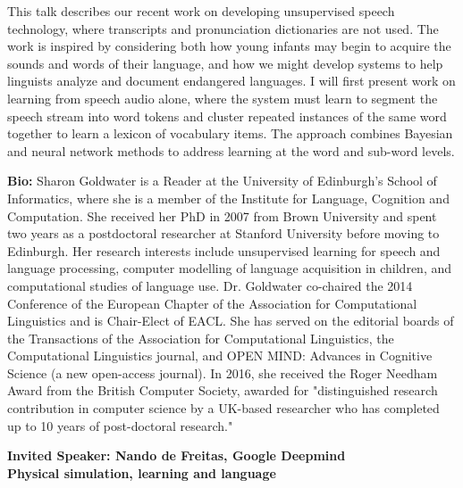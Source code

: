 \documentclass[11pt]{article}
\begin{document}
This talk describes our recent work on developing unsupervised speech technology, where transcripts and pronunciation dictionaries are not used. The work is inspired by considering both how young infants may begin to acquire the sounds and words of their language, and how we might develop systems to help linguists analyze and document endangered languages. I will first present work on learning from speech audio alone, where the system must learn to segment the speech stream into word tokens and cluster repeated instances of the same word together to learn a lexicon of vocabulary items. The approach combines Bayesian and neural network methods to address learning at the word and sub-word levels.

{\bf Bio:} 
Sharon Goldwater is a Reader at the University of Edinburgh's School of Informatics, where she is a member of the Institute for Language, Cognition and Computation. She received her PhD in 2007 from Brown University and spent two years as a postdoctoral researcher at Stanford University before moving to Edinburgh. Her research interests include unsupervised learning for speech and language processing, computer modelling of language acquisition in children, and computational studies of language use. Dr. Goldwater co-chaired the 2014 Conference of the European Chapter of the Association for Computational Linguistics and is Chair-Elect of EACL. She has served on the editorial boards of the Transactions of the Association for Computational Linguistics, the Computational Linguistics journal, and OPEN MIND: Advances in Cognitive Science (a new open-access journal). In 2016, she received the Roger Needham Award from the British Computer Society, awarded for "distinguished research contribution in computer science by a UK-based researcher who has completed up to 10 years of post-doctoral research."

\begin{center}
{\LARGE \bf Invited Speaker: Nando de Freitas, Google Deepmind}\\
{\Large \bf Physical simulation, learning and language}
\end{center}

\end{document}
